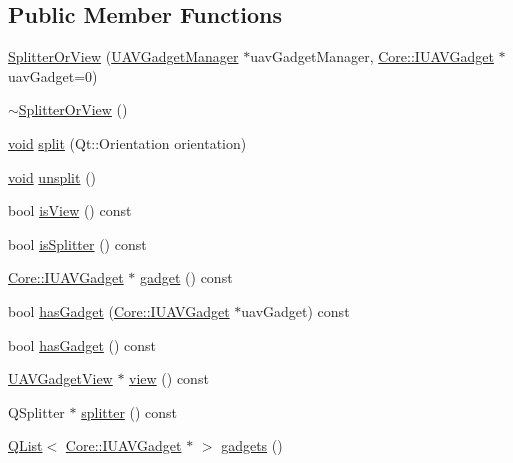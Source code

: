 \subsection*{Public Member Functions}
\begin{DoxyCompactItemize}
\item 
\hyperlink{group___core_plugin_ga0cde2ec154e958879a859372bbc74e36}{Splitter\-Or\-View} (\hyperlink{class_core_1_1_u_a_v_gadget_manager}{U\-A\-V\-Gadget\-Manager} $\ast$uav\-Gadget\-Manager, \hyperlink{class_core_1_1_i_u_a_v_gadget}{Core\-::\-I\-U\-A\-V\-Gadget} $\ast$uav\-Gadget=0)
\item 
\hyperlink{group___core_plugin_ga42605d72009aca0f129477fe21bf7d32}{$\sim$\-Splitter\-Or\-View} ()
\item 
\hyperlink{group___u_a_v_objects_plugin_ga444cf2ff3f0ecbe028adce838d373f5c}{void} \hyperlink{group___core_plugin_gae258b7ec5e2f7777bbdeee7304e1d79a}{split} (Qt\-::\-Orientation orientation)
\item 
\hyperlink{group___u_a_v_objects_plugin_ga444cf2ff3f0ecbe028adce838d373f5c}{void} \hyperlink{group___core_plugin_gaff0d2db70952dd90a8a9eaf4c84ae66f}{unsplit} ()
\item 
bool \hyperlink{group___core_plugin_gac5f0d73d9c3c17c18b5175bc96676b39}{is\-View} () const 
\item 
bool \hyperlink{group___core_plugin_ga6b5dd4764ff19447ec887f2b48bce54e}{is\-Splitter} () const 
\item 
\hyperlink{class_core_1_1_i_u_a_v_gadget}{Core\-::\-I\-U\-A\-V\-Gadget} $\ast$ \hyperlink{group___core_plugin_gaf1fee806596e173c1a7aac4bd0864565}{gadget} () const 
\item 
bool \hyperlink{group___core_plugin_gad86937a62c61ad121f86911083513f35}{has\-Gadget} (\hyperlink{class_core_1_1_i_u_a_v_gadget}{Core\-::\-I\-U\-A\-V\-Gadget} $\ast$uav\-Gadget) const 
\item 
bool \hyperlink{group___core_plugin_ga988eeacf124937c7e90853f95af39ce3}{has\-Gadget} () const 
\item 
\hyperlink{class_core_1_1_internal_1_1_u_a_v_gadget_view}{U\-A\-V\-Gadget\-View} $\ast$ \hyperlink{group___core_plugin_ga885a960ed8f9cdcfa3e01e739743f93d}{view} () const 
\item 
Q\-Splitter $\ast$ \hyperlink{group___core_plugin_gaa4c325c0a3087b708b0fb00ba36a8646}{splitter} () const 
\item 
\hyperlink{class_q_list}{Q\-List}$<$ \hyperlink{class_core_1_1_i_u_a_v_gadget}{Core\-::\-I\-U\-A\-V\-Gadget} $\ast$ $>$ \hyperlink{group___core_plugin_gaf764d23e51e392c911d26816423a67ac}{gadgets} ()

\end{DoxyCompactItemize}
